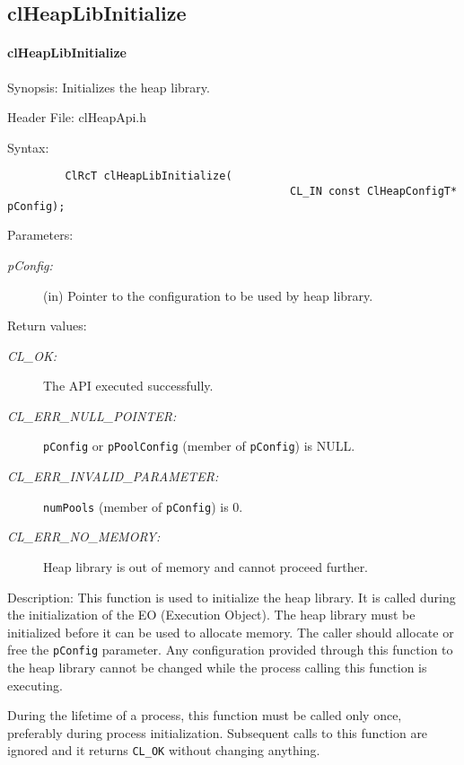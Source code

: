 \begin{flushleft}
\subsection{clHeapLibInitialize}
\hypertarget{pageheap101}{}\paragraph{clHeapLibInitialize}\label{pageheap101}
\begin{Desc}
\item[Synopsis:]Initializes the heap library.\end{Desc}
\begin{Desc}
\item[Header File:]clHeapApi.h\end{Desc}
\begin{Desc}
\item[Syntax:]

\footnotesize\begin{verbatim}         ClRcT clHeapLibInitialize(
                                            CL_IN const ClHeapConfigT* pConfig);
\end{verbatim}
\normalsize
\end{Desc}
\begin{Desc}
\item[Parameters:]
\begin{description}
\item[{\em pConfig:}](in) Pointer to the configuration to be used by heap library.
\end{description}
\end{Desc}
\begin{Desc}
\item[Return values:]
\begin{description}
\item[{\em CL\_\-OK:}]The API executed successfully.
\item[{\em CL\_\-ERR\_\-NULL\_\-POINTER:}]{\tt{pConfig}} or {\tt{pPoolConfig}} (member of {\tt{pConfig}}) is NULL.
\item[{\em CL\_\-ERR\_\-INVALID\_\-PARAMETER:}]{\tt{numPools}} (member of {\tt{pConfig}}) is 0.
\item[{\em CL\_\-ERR\_\-NO\_\-MEMORY:}]Heap library is out of memory and cannot proceed further.
\end{description}
\end{Desc}
\begin{Desc}
\item[Description:]
This function is used to initialize the heap library. It is called during the initialization of the EO (Execution Object).
The heap library must be initialized before it can be used to allocate memory.
The caller should allocate or free the {\tt{pConfig}} parameter. Any configuration provided
through this function to the heap library cannot be changed while the
process calling this function is executing. 
\par 
During the lifetime of a process, this function must be called only once, preferably during
process initialization. Subsequent calls to this function are ignored and it returns {\tt{CL\_\-OK}} without changing anything.


\end{Desc}
\end{flushleft}
